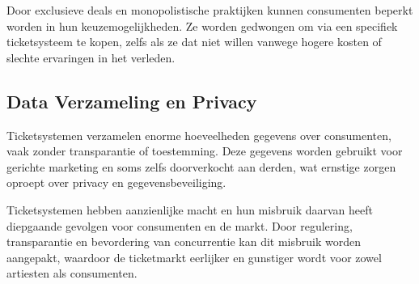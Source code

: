 Door exclusieve deals en monopolistische praktijken kunnen consumenten beperkt worden in hun keuzemogelijkheden. 
Ze worden gedwongen om via een specifiek ticketsysteem te kopen, 
zelfs als ze dat niet willen vanwege hogere kosten of slechte ervaringen in het verleden.

\subsection{Data Verzameling en Privacy}

Ticketsystemen verzamelen enorme hoeveelheden gegevens over consumenten, 
vaak zonder transparantie of toestemming. 
Deze gegevens worden gebruikt voor gerichte marketing en soms zelfs doorverkocht aan derden, 
wat ernstige zorgen oproept over privacy en gegevensbeveiliging.

\vspace{10 mm}

Ticketsystemen hebben aanzienlijke macht en hun misbruik daarvan heeft diepgaande gevolgen voor consumenten en de markt. 
Door regulering, 
transparantie en bevordering van concurrentie kan dit misbruik worden aangepakt, 
waardoor de ticketmarkt eerlijker en gunstiger wordt voor zowel artiesten als consumenten.

\cite{Similarweb, Wikimedia, Investopedia}